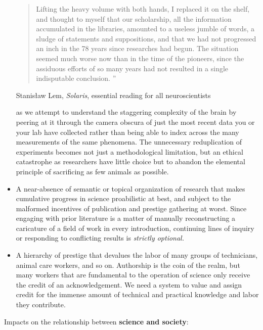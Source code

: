 \begin{itemize}
{    \begin{quote}
    Lifting the heavy volume with both hands, I replaced it on the
    shelf, and thought to myself that our scholarship, all the
    information accumulated in the libraries, amounted to a useless
    jumble of words, a sludge of statements and suppositions, and that
    we had not progressed an inch in the 78 years since researches had
    begun. The situation seemed much worse now than in the time of the
    pioneers, since the assiduous efforts of so many years had not
    resulted in a single indisputable conclusion. ''
    \end{quote}

    Stanisław Lem, \emph{Solaris}, essential reading for all
    neuroscientists} as we attempt to understand the staggering
  complexity of the brain by peering at it through the camera obscura of
  just the most recent data you or your lab have collected rather than
  being able to index across the many measurements of the same
  phenomena. The unnecessary reduplication of experiments becomes not
  just a methodological limitation, but an ethical catastrophe as
  researchers have little choice but to abandon the elemental principle
  of sacrificing as few animals as possible.
\item
  A near-absence of semantic or topical organization of research that
  makes cumulative progress in science proabilistic at best, and subject
  to the malformed incentives of publication and prestige gathering at
  worst. Since engaging with prior literature is a matter of manually
  reconstructing a caricature of a field of work in every introduction,
  continuing lines of inquiry or responding to conflicting results is
  \emph{strictly optional.}
\item
  A hierarchy of prestige that devalues the labor of many groups of
  technicians, animal care workers, and so on. Authorship is the coin of
  the realm, but many workers that are fundamental to the operation of
  science only receive the credit of an acknowledgement. We need a
  system to value and assign credit for the immense amount of technical
  and practical knowledge and labor they contribute.
\end{itemize}

Impacts on the relationship between \textbf{science and society}:

